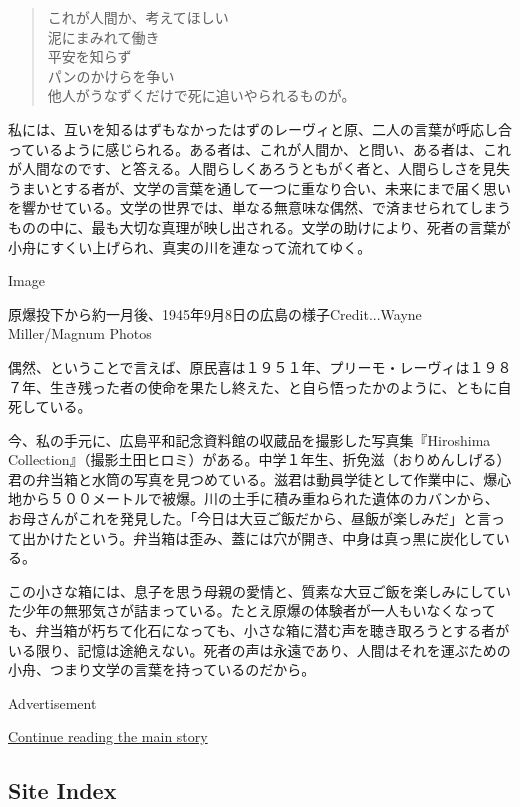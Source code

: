 \begin{quote}
これが人間か、考えてほしい\\
泥にまみれて働き\\
平安を知らず\\
パンのかけらを争い\\
他人がうなずくだけで死に追いやられるものが。
\end{quote}

私には、互いを知るはずもなかったはずのレーヴィと原、二人の言葉が呼応し合っているように感じられる。ある者は、これが人間か、と問い、ある者は、これが人間なのです、と答える。人間らしくあろうともがく者と、人間らしさを見失うまいとする者が、文学の言葉を通して一つに重なり合い、未来にまで届く思いを響かせている。文学の世界では、単なる無意味な偶然、で済ませられてしまうものの中に、最も大切な真理が映し出される。文学の助けにより、死者の言葉が小舟にすくい上げられ、真実の川を連なって流れてゆく。

Image

原爆投下から約一月後、1945年9月8日の広島の様子Credit...Wayne
Miller/Magnum Photos

偶然、ということで言えば、原民喜は１９５１年、プリーモ・レーヴィは１９８７年、生き残った者の使命を果たし終えた、と自ら悟ったかのように、ともに自死している。

今、私の手元に、広島平和記念資料館の収蔵品を撮影した写真集『Hiroshima
Collection』（撮影土田ヒロミ）がある。中学１年生、折免滋（おりめんしげる）君の弁当箱と水筒の写真を見つめている。滋君は動員学徒として作業中に、爆心地から５００メートルで被爆。川の土手に積み重ねられた遺体のカバンから、お母さんがこれを発見した。「今日は大豆ご飯だから、昼飯が楽しみだ」と言って出かけたという。弁当箱は歪み、蓋には穴が開き、中身は真っ黒に炭化している。

この小さな箱には、息子を思う母親の愛情と、質素な大豆ご飯を楽しみにしていた少年の無邪気さが詰まっている。たとえ原爆の体験者が一人もいなくなっても、弁当箱が朽ちて化石になっても、小さな箱に潜む声を聴き取ろうとする者がいる限り、記憶は途絶えない。死者の声は永遠であり、人間はそれを運ぶための小舟、つまり文学の言葉を持っているのだから。

Advertisement

\protect\hyperlink{after-bottom}{Continue reading the main story}

\hypertarget{site-index}{%
\subsection{Site Index}\label{site-index}}

